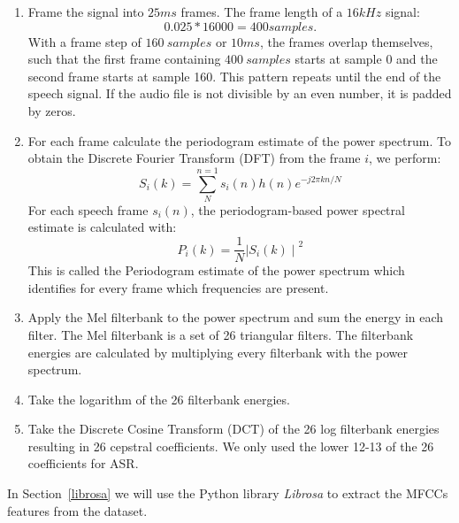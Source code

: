 \begin{enumerate}[label=\arabic*.]
  \item Frame the signal into $25ms$ frames. The frame length of a $16kHz$
    signal:
  \begin{equation} 
    0.025*16000 = 400 samples.
  \end{equation}
  With a frame step of $160\ samples$ or $10ms$, the frames overlap themselves,
  such that the first frame containing $400\ samples$ starts at sample 0 and the
  second frame starts at sample 160. This pattern repeats until the end of the
  speech signal. If the audio file is not divisible by an even number, it is
  padded by zeros.\\
  \item For each frame calculate the periodogram estimate of the power spectrum.
    To obtain the Discrete Fourier Transform (DFT) from the frame $i$, we
    perform:
    \begin{equation}
      S_{i}(k) = \sum_{N}^{n=1}s_i(n)h(n)e^{-j2\pi kn/N}
    \end{equation}
    For each speech frame $s_{i}(n)$, the periodogram-based power spectral
    estimate is calculated with:
    \begin{equation}
      P_{i}(k)=\frac{1}{N}{\mid{S_{i}(k)}\mid}^{2}
    \end{equation}
  This is called the Periodogram estimate of the power spectrum which identifies
  for every frame which frequencies are present.\\
  \item Apply the Mel filterbank to the power spectrum and sum the energy in
    each filter. The Mel filterbank is a set of 26 triangular filters. The
    filterbank energies are calculated by multiplying every filterbank with the
    power spectrum.\\
  \item Take the logarithm of the 26 filterbank energies.\\
  \item Take the Discrete Cosine Transform (DCT) of the 26 log filterbank
    energies resulting in 26 cepstral coefficients. We only used the lower 12-13
    of the 26 coefficients for ASR.\\
\end{enumerate}

In Section~\ref{librosa} we will use the Python library \textit{Librosa} to
extract the MFCCs features from the dataset.
